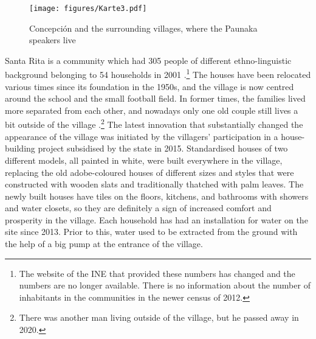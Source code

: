 \begin{figure}[t]
\texttt{[image: figures/Karte3.pdf]}
\caption[Concepción and the surrounding villages]{Concepción and the surrounding villages, where the Paunaka speakers live }
\label{fig:MapConce}
\end{figure}

Santa Rita is a community which had 305 people of different ethno-linguistic background belonging to 54 households in 2001 \citep[]{INE2001}.\footnote{The website of the INE that provided these numbers has changed and the numbers are no longer available. There is no information about the number of inhabitants in the communities in the newer census of 2012.} The houses have been relocated various times since its foundation in the 1950s, and the village is now centred around the school and the small football field. In former times, the families lived more separated from each other, and nowadays only one old couple still lives a bit outside of the village \citep[6]{Villalta2013}.\footnote{There was another man living outside of the village, but he passed away in 2020.} The latest innovation that substantially changed the appearance of the village was initiated by the villagers’ participation in a house-building project subsidised by the state in 2015. Standardised houses of two different models, all painted in white, were built everywhere in the village, replacing the old adobe-coloured houses of different sizes and styles that were constructed with wooden slats and traditionally thatched with palm leaves. The newly built houses have tiles on the floors, kitchens, and bathrooms with showers and water closets, so they are definitely a sign of increased comfort and prosperity in the village. Each household has had an installation for water on the site since 2013. Prior to this, water used to be extracted from the ground with the help of a big pump at the entrance of the village.

